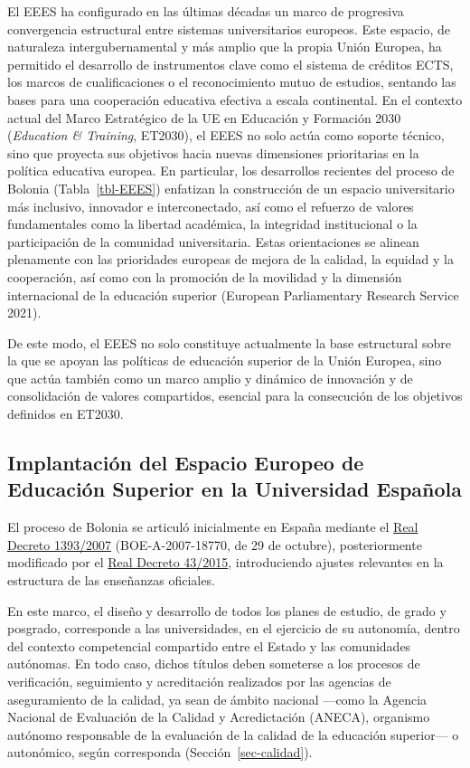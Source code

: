 \documentclass[
  11pt,
  a4paper,
  twoside]{scrreprt}
\begin{document}
El EEES ha configurado en las últimas décadas un marco de progresiva
convergencia estructural entre sistemas universitarios europeos. Este
espacio, de naturaleza intergubernamental y más amplio que la propia
Unión Europea, ha permitido el desarrollo de instrumentos clave como el
sistema de créditos ECTS, los marcos de cualificaciones o el
reconocimiento mutuo de estudios, sentando las bases para una
cooperación educativa efectiva a escala continental. En el contexto
actual del Marco Estratégico de la UE en Educación y Formación 2030
(\emph{Education \& Training}, ET2030), el EEES no solo actúa como
soporte técnico, sino que proyecta sus objetivos hacia nuevas
dimensiones prioritarias en la política educativa europea. En
particular, los desarrollos recientes del proceso de Bolonia
(Tabla~\ref{tbl-EEES}) enfatizan la construcción de un espacio
universitario más inclusivo, innovador e interconectado, así como el
refuerzo de valores fundamentales como la libertad académica, la
integridad institucional o la participación de la comunidad
universitaria. Estas orientaciones se alinean plenamente con las
prioridades europeas de mejora de la calidad, la equidad y la
cooperación, así como con la promoción de la movilidad y la dimensión
internacional de la educación superior (European Parliamentary Research
Service 2021).

De este modo, el EEES no solo constituye actualmente la base estructural
sobre la que se apoyan las políticas de educación superior de la Unión
Europea, sino que actúa también como un marco amplio y dinámico de
innovación y de consolidación de valores compartidos, esencial para la
consecución de los objetivos definidos en ET2030.

\subsection{Implantación del Espacio Europeo de Educación Superior en la
Universidad
Española}\label{implantaciuxf3n-del-espacio-europeo-de-educaciuxf3n-superior-en-la-universidad-espauxf1ola}

El proceso de Bolonia se articuló inicialmente en España mediante el
\href{https://www.boe.es/buscar/act.php?id=BOE-A-2007-18770}{Real
Decreto 1393/2007} (BOE-A-2007-18770, de 29 de octubre), posteriormente
modificado por el
\href{https://www.boe.es/buscar/doc.php?id=BOE-A-2015-943}{Real Decreto
43/2015}, introduciendo ajustes relevantes en la estructura de las
enseñanzas oficiales.

En este marco, el diseño y desarrollo de todos los planes de estudio, de
grado y posgrado, corresponde a las universidades, en el ejercicio de su
autonomía, dentro del contexto competencial compartido entre el Estado y
las comunidades autónomas. En todo caso, dichos títulos deben someterse
a los procesos de verificación, seguimiento y acreditación realizados
por las agencias de aseguramiento de la calidad, ya sean de ámbito
nacional ---como la Agencia Nacional de Evaluación de la Calidad y
Acredictación (ANECA), organismo autónomo responsable de la evaluación
de la calidad de la educación superior--- o autonómico, según
corresponda (Sección~\ref{sec-calidad}).
\end{document}
